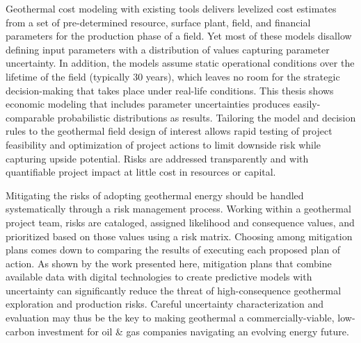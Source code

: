 Geothermal cost modeling with existing tools delivers levelized cost estimates from a set of pre-determined resource, surface plant, field, and financial parameters for the production phase of a field. Yet most of these models disallow defining input parameters with a distribution of values capturing parameter uncertainty. In addition, the models assume static operational conditions over the lifetime of the field (typically 30 years), which leaves no room for the strategic decision-making that takes place under real-life conditions. This thesis shows economic modeling that includes parameter uncertainties produces easily-comparable probabilistic distributions as results. Tailoring the model and decision rules to the geothermal field design of interest allows rapid testing of project feasibility and optimization of project actions to limit downside risk while capturing upside potential. Risks are addressed transparently and with quantifiable project impact at little cost in resources or capital.

Mitigating the risks of adopting geothermal energy should be handled systematically through a risk management process. Working within a geothermal project team, risks are cataloged, assigned likelihood and consequence values, and prioritized based on those values using a risk matrix. Choosing among mitigation plans comes down to comparing the results of executing each proposed plan of action. As shown by the work presented here, mitigation plans that combine available data with digital technologies to create predictive models with uncertainty can significantly reduce the threat of high-consequence geothermal exploration and production risks. Careful uncertainty characterization and evaluation may thus be the key to making geothermal a commercially-viable, low-carbon investment for oil \& gas companies navigating an evolving energy future. 